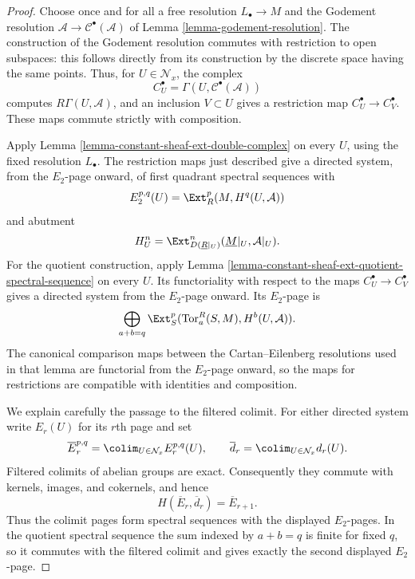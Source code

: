 \begin{proof}
Choose once and for all a free resolution $L_\bullet \to M$ and the
Godement resolution
$\mathcal{A} \to \mathcal{C}^\bullet(\mathcal{A})$ of
Lemma \ref{lemma-godement-resolution}. The construction of the Godement
resolution commutes with restriction to open subspaces: this follows
directly from its construction by the discrete space having the same
points. Thus, for $U \in \mathcal{N}_x$, the complex
$$
C_U^\bullet = \Gamma(U, \mathcal{C}^\bullet(\mathcal{A}))
$$
computes $R\Gamma(U, \mathcal{A})$, and an inclusion $V \subset U$ gives
a restriction map $C_U^\bullet \to C_V^\bullet$. These maps commute
strictly with composition.

Apply Lemma \ref{lemma-constant-sheaf-ext-double-complex} on every $U$,
using the fixed resolution $L_\bullet$. The restriction maps just described
give a directed system, from the $E_2$-page onward, of first quadrant
spectral sequences with
$$
E_2^{p, q}(U) = \Ext_R^p(M, H^q(U, \mathcal{A}))
$$
and abutment
$$
H_U^n =
\Ext^n_{D(\underline{R}|_U)}
(\underline{M}|_U, \mathcal{A}|_U).
$$
For the quotient construction, apply
Lemma \ref{lemma-constant-sheaf-ext-quotient-spectral-sequence} on every
$U$. Its functoriality with respect to the maps
$C_U^\bullet \to C_V^\bullet$ gives a directed system from the $E_2$-page
onward. Its $E_2$-page is
$$
\bigoplus_{a + b = q}
\Ext_S^p(\text{Tor}_a^R(S, M), H^b(U, \mathcal{A})).
$$
The canonical comparison maps between the Cartan--Eilenberg resolutions
used in that lemma are functorial from the $E_2$-page onward, so the maps
for restrictions are compatible with identities and composition.

We explain carefully the passage to the filtered colimit. For either
directed system write $E_r(U)$ for its $r$th page and set
$$
\overline E_r^{p, q} =
\colim_{U \in \mathcal{N}_x} E_r^{p, q}(U),
\qquad
\overline d_r = \colim_{U \in \mathcal{N}_x} d_r(U).
$$
Filtered colimits of abelian groups are exact. Consequently they commute
with kernels, images, and cokernels, and hence
$$
H(\overline E_r, \overline d_r) = \overline E_{r + 1}.
$$
Thus the colimit pages form spectral sequences with the displayed
$E_2$-pages. In the quotient spectral sequence the sum indexed by
$a + b = q$ is finite for fixed $q$, so it commutes with the filtered
colimit and gives exactly the second displayed $E_2$-page.


\end{proof}
